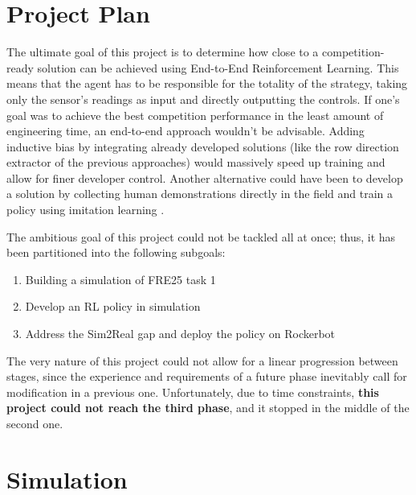 \documentclass[11pt,a4paper,twocolumn]{article}
\begin{document}
\section{Project Plan}
The ultimate goal of this project is to determine how close to a competition-ready solution can be achieved using End-to-End Reinforcement Learning. This means that the agent has to be responsible for the totality of the strategy, taking only the sensor's readings as input and directly outputting the controls. If one's goal was to achieve the best competition performance in the least amount of engineering time, an end-to-end approach wouldn't be advisable. Adding inductive bias by integrating already developed solutions (like the row direction extractor of the previous approaches) would massively speed up training and allow for finer developer control.
Another alternative could have been to develop a solution by collecting human demonstrations directly in the field and train a policy using imitation learning \cite{ImitationLearning}. 

The ambitious goal of this project could not be tackled all at once; thus, it has been partitioned into the following subgoals:
\begin{enumerate}
    \item Building a simulation of FRE25 task 1
    \item Develop an RL policy in simulation
    \item Address the Sim2Real gap and deploy the policy on Rockerbot
\end{enumerate}

The very nature of this project could not allow for a linear progression between stages, since the experience and requirements of a future phase inevitably call for modification in a previous one. Unfortunately, due to time constraints, \textbf{this project could not reach the third phase}, and it stopped in the middle of the second one.

\section{Simulation}
\end{document}
